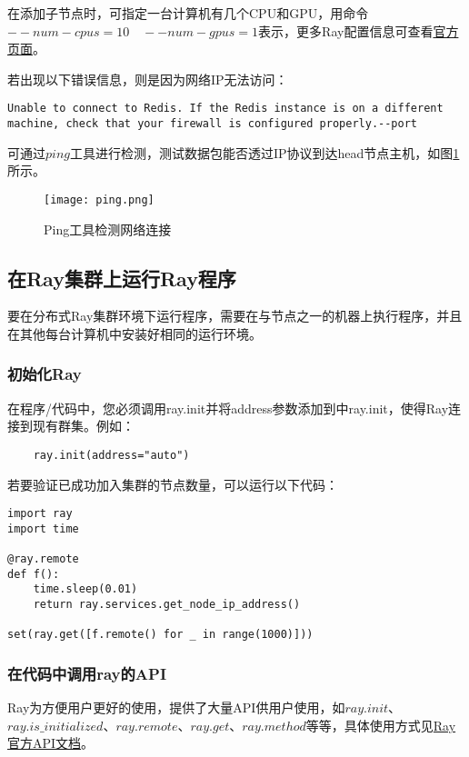 在添加子节点时，可指定一台计算机有几个CPU和GPU，用命令$ --num-cpus=10 \quad --num-gpus=1 $表示，更多Ray配置信息可查看\href{https://docs.ray.io/en/master/configure.html#configuring-ray}{官方页面}。

若出现以下错误信息，则是因为网络IP无法访问：
\lstset{language=Bash, breaklines, columns=flexible}
\begin{lstlisting}
Unable to connect to Redis. If the Redis instance is on a different machine, check that your firewall is configured properly.--port
\end{lstlisting}

可通过$ ping $工具进行检测，测试数据包能否透过IP协议到达head节点主机，如图\ref{Ping工具检测网络连接}所示。
\begin{figure}[h]
  \centering
  \texttt{[image: ping.png]}
  \caption{Ping工具检测网络连接}
  \label{Ping工具检测网络连接}
\end{figure}

\subsection{在Ray集群上运行Ray程序}
要在分布式Ray集群环境下运行程序，需要在与节点之一的机器上执行程序，并且在其他每台计算机中安装好相同的运行环境。
\subsubsection{初始化Ray}
在程序/代码中，您必须调用ray.init并将address参数添加到中ray.init，使得Ray连接到现有群集。例如：
\lstset{language=Bash, breaklines, columns=flexible}
\begin{lstlisting}
    ray.init(address="auto")
\end{lstlisting}

若要验证已成功加入集群的节点数量，可以运行以下代码：
\lstset{language=python, breaklines, columns=flexible, numbers=left}
\begin{lstlisting}
import ray
import time

@ray.remote
def f():
    time.sleep(0.01)
    return ray.services.get_node_ip_address()

set(ray.get([f.remote() for _ in range(1000)]))
\end{lstlisting}

\subsubsection{在代码中调用ray的API}
Ray为方便用户更好的使用，提供了大量API供用户使用，如$ ray.init $、$ ray.is\_initialized $、$ ray.remote $、$ ray.get $、$ ray.method $等等，具体使用方式见\href{https://docs.ray.io/en/master/package-ref.html#}{Ray官方API文档}。